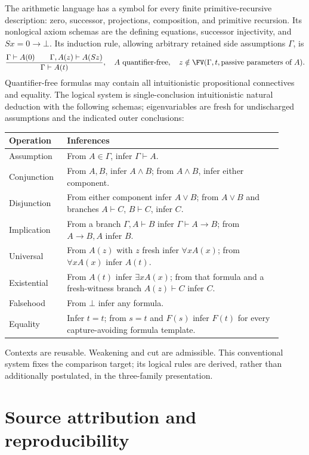 The arithmetic language has a symbol for every finite primitive-recursive
description: zero, successor, projections, composition, and primitive
recursion. Its nonlogical axiom schemas are the defining equations,
successor injectivity, and $Sx=0\to\bot$. Its induction rule, allowing
arbitrary retained side assumptions $\Gamma$, is
\[
 \frac{\Gamma\vdash A(0)\qquad\Gamma,A(z)\vdash A(Sz)}
      {\Gamma\vdash A(t)},
 \quad A\text{ quantifier-free},\quad
 z\notin\FV(\Gamma,t,\text{passive parameters of }A).
\]
Quantifier-free formulas may contain all intuitionistic propositional
connectives and equality. The logical system is single-conclusion
intuitionistic natural deduction with the following schemas; eigenvariables
are fresh for undischarged assumptions and the indicated outer conclusions:
\begin{center}
\begin{tabular}{p{0.19\linewidth}p{0.72\linewidth}}
\toprule
Operation & Inferences\\
\midrule
Assumption & From $A\in\Gamma$, infer $\Gamma\vdash A$.\\[2pt]
Conjunction & From $A,B$, infer $A\land B$; from $A\land B$, infer either component.\\[2pt]
Disjunction & From either component infer $A\lor B$; from $A\lor B$ and branches $A\vdash C$, $B\vdash C$, infer $C$.\\[2pt]
Implication & From a branch $\Gamma,A\vdash B$ infer $\Gamma\vdash A\to B$; from $A\to B,A$ infer $B$.\\[2pt]
Universal & From $A(z)$ with $z$ fresh infer $\forall x A(x)$; from $\forall x A(x)$ infer $A(t)$.\\[2pt]
Existential & From $A(t)$ infer $\exists x A(x)$; from that formula and a fresh-witness branch $A(z)\vdash C$ infer $C$.\\[2pt]
Falsehood & From $\bot$ infer any formula.\\[2pt]
Equality & Infer $t=t$; from $s=t$ and $F(s)$ infer $F(t)$ for every capture-avoiding formula template.\\
\bottomrule
\end{tabular}
\end{center}
Contexts are reusable. Weakening and cut are admissible. This conventional
system fixes the comparison target; its logical rules are derived, rather
than additionally postulated, in the three-family presentation.

\section{Source attribution and reproducibility}


